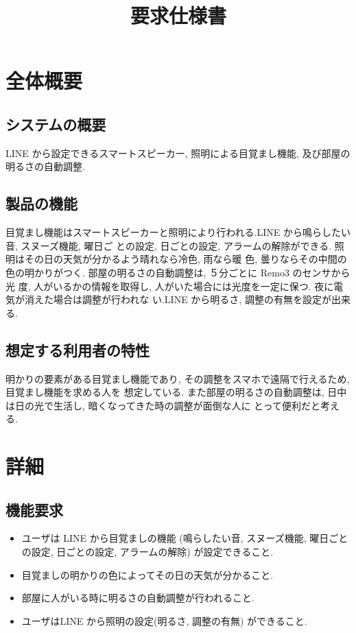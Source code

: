 \documentclass{jarticle}
\title{要求仕様書}
\date{}
\begin{document}
\maketitle

\section*{全体概要}
\subsection*{システムの概要}
LINE から設定できるスマートスピーカー, 照明による目覚まし機能, 及び部屋の明るさの自動調整.
\subsection*{製品の機能}
目覚まし機能はスマートスピーカーと照明により行われる.LINE から鳴らしたい音, スヌーズ機能, 曜日ご
との設定, 日ごとの設定, アラームの解除ができる. 照明はその日の天気が分かるよう晴れなら冷色, 雨なら暖
色, 曇りならその中間の色の明かりがつく. 部屋の明るさの自動調整は, ５分ごとに Remo3 のセンサから光
度, 人がいるかの情報を取得し, 人がいた場合には光度を一定に保つ. 夜に電気が消えた場合は調整が行われな
い.LINE から明るさ, 調整の有無を設定が出来る.
\subsection*{想定する利用者の特性}
明かりの要素がある目覚まし機能であり, その調整をスマホで遠隔で行えるため, 目覚まし機能を求める人を
想定している. また部屋の明るさの自動調整は, 日中は日の光で生活し, 暗くなってきた時の調整が面倒な人に
とって便利だと考える.

\section*{詳細}
\subsection*{機能要求}
\begin{itemize}
    \item ユーザは LINE から目覚ましの機能 (鳴らしたい音, スヌーズ機能, 曜日ごとの設定, 日ごとの設定, アラームの解除) が設定できること.\\
    \item 目覚ましの明かりの色によってその日の天気が分かること.\\
    \item 部屋に人がいる時に明るさの自動調整が行われること.\\
    \item ユーザはLINE から照明の設定(明るさ, 調整の有無) ができること.\\
\end{itemize}
\end{document}

